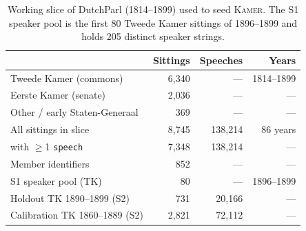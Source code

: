 \documentclass[sigconf,review,anonymous]{acmart}
\newcommand{\sys}{\textsc{Kamer}}
\begin{document}
\begin{table}[H]
\caption{Working slice of DutchParl (1814--1899) used to seed \sys{}. The
S1 speaker pool is the first 80 Tweede Kamer sittings of 1896--1899 and
holds 205 distinct speaker strings.}
\label{tab:corpus}
\centering\small
\begin{tabular}{lrrr}
\toprule
 & Sittings & Speeches & Years \\
\midrule
Tweede Kamer (commons) & 6{,}340 & --- & 1814--1899 \\
Eerste Kamer (senate) & 2{,}036 & --- & --- \\
Other / early Staten-Generaal & 369 & --- & --- \\
\midrule
All sittings in slice & 8{,}745 & 138{,}214 & 86 years \\
\quad with $\geq$1 \texttt{speech} & 7{,}348 & 138{,}214 & --- \\
Member identifiers & 852 & --- & --- \\
S1 speaker pool (TK) & 80 & --- & 1896--1899 \\
Holdout TK 1890--1899 (S2) & 731 & 20{,}166 & --- \\
Calibration TK 1860--1889 (S2) & 2{,}821 & 72{,}112 & --- \\
\bottomrule
\end{tabular}
\end{table}
\end{document}
